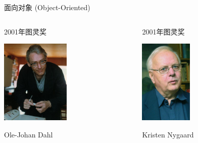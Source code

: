 \begin{frame}{面向对象 (Object-Oriented)}
  \begin{columns}
    \begin{column}{.33\textwidth}
      \begin{block}{2001年图灵奖}
        \begin{center}
          \includegraphics[height=4cm]{dahl.jpg}

          Ole-Johan Dahl
        \end{center}
      \end{block}
    \end{column}
    \begin{column}{.33\textwidth}
      \begin{block}{2001年图灵奖}
        \begin{center}
          \includegraphics[height=4cm]{kristen.jpg}

          Kristen Nygaard
        \end{center}
      \end{block}
    \end{column}
  \end{columns}
\end{frame}

